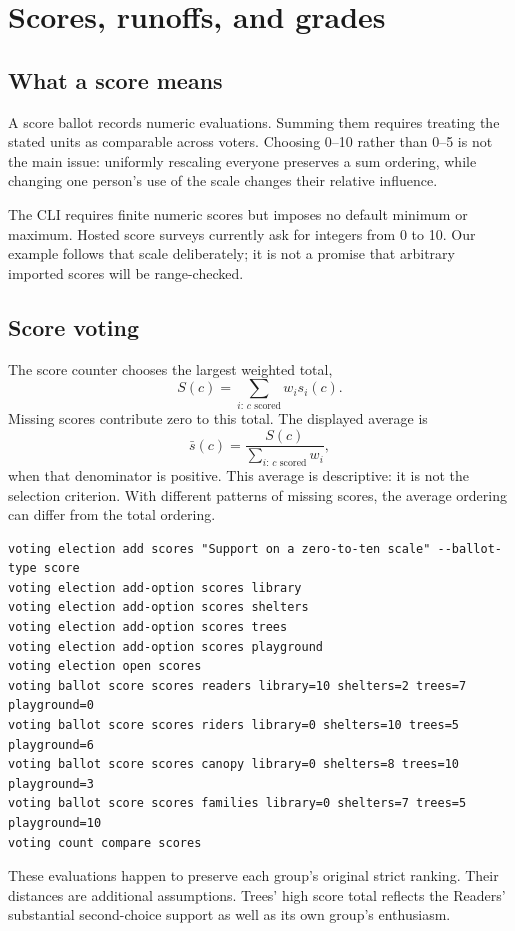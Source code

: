 \chapter{Scores, runoffs, and grades}
\label{chap:cardinal}
\section{What a score means}
A score ballot records numeric evaluations. Summing them requires treating the stated units as comparable across voters. Choosing 0--10 rather than 0--5 is not the main issue: uniformly rescaling everyone preserves a sum ordering, while changing one person's use of the scale changes their relative influence.

The CLI requires finite numeric scores but imposes no default minimum or maximum. Hosted score surveys currently ask for integers from 0 to 10. Our example follows that scale deliberately; it is not a promise that arbitrary imported scores will be range-checked.

\section{Score voting}
The score counter chooses the largest weighted total,
\[
S(c)=\sum_{i:\,c\text{ scored}}w_i s_i(c).
\]
Missing scores contribute zero to this total. The displayed average is
\[
\bar s(c)=\frac{S(c)}{\sum_{i:\,c\text{ scored}}w_i},
\]
when that denominator is positive. This average is descriptive: it is not the selection criterion. With different patterns of missing scores, the average ordering can differ from the total ordering.
\begin{lstlisting}[style=votingrun]
voting election add scores "Support on a zero-to-ten scale" --ballot-type score
voting election add-option scores library
voting election add-option scores shelters
voting election add-option scores trees
voting election add-option scores playground
voting election open scores
voting ballot score scores readers library=10 shelters=2 trees=7 playground=0
voting ballot score scores riders library=0 shelters=10 trees=5 playground=6
voting ballot score scores canopy library=0 shelters=8 trees=10 playground=3
voting ballot score scores families library=0 shelters=7 trees=5 playground=10
voting count compare scores
\end{lstlisting}
These evaluations happen to preserve each group's original strict ranking. Their distances are additional assumptions. Trees' high score total reflects the Readers' substantial second-choice support as well as its own group's enthusiasm.

